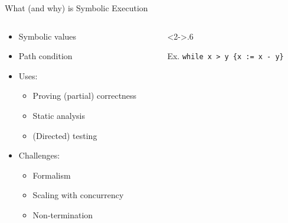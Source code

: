 \documentclass{beamer}
\newcommand{\faded}[2][35]{\textcolor{fg!#1}{#2}}
\begin{document}
\begin{frame}{What (and why) is Symbolic Execution}
  \begin{columns}
    \begin{column}{.4\textwidth}
      \begin{itemize}
        \item<+-> Symbolic values
        \item<+-> Path condition
        \item<+-> Uses:
              \begin{itemize}
                \item Proving (partial) correctness
                \item Static analysis
                \item (Directed) testing
              \end{itemize}
        \item<+-> Challenges:
              \begin{itemize}
                \item Formalism
                \item \alert{Scaling with concurrency}
                \item \faded{Non-termination}
              \end{itemize}
      \end{itemize}
    \end{column}
    \begin{column}<2->{.6\textwidth}
      \begin{block}{Ex. \texttt{while x > y \{x := x - y\}}}
        \begin{figure}
        \end{figure}
      \end{block}
    \end{column}
  \end{columns}
\end{frame}
\end{document}
